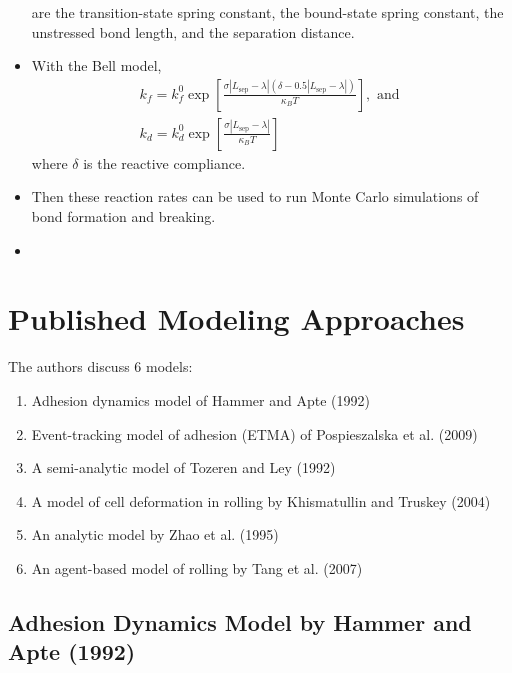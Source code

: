 \documentclass[
10pt, %
letterpaper, %
twocolumn, %
landscape %
]{article}
\begin{document}
\begin{itemize}
  are the transition-state spring constant, the bound-state spring
  constant, the unstressed bond length, and the separation distance.
\item With the Bell model, 
  \begin{align*}
    k_f = k_f^0 \exp\left[\frac{\sigma \left| L_\text{sep} - \lambda
    \right|(\delta - 0.5\left|L_\text{sep} - \lambda\right|)}{\kappa_B
    T}\right], \text{ and } \\ 
    k_d = k_d^0\exp\left[\frac{\sigma\left|L_\text{sep} -
    \lambda\right|}{\kappa_B T}\right]
  \end{align*}
  where $\delta$ is the reactive compliance.
\item Then these reaction rates can be used to run Monte Carlo
  simulations of bond formation and breaking.
\item 
\end{itemize}


\section{Published Modeling Approaches} 

The authors discuss 6 models:
\begin{enumerate}
\item Adhesion dynamics model of Hammer and Apte (1992)
\item Event-tracking model of adhesion (ETMA) of Pospieszalska et
  al. (2009)
\item A semi-analytic model of Tozeren and Ley (1992)
\item A model of cell deformation in rolling by Khismatullin and
  Truskey (2004)
\item An analytic model by Zhao et al. (1995)
\item An agent-based model of rolling by Tang et al. (2007)
\end{enumerate}

\subsection{Adhesion Dynamics Model by Hammer and Apte (1992)}
\label{sec:adhes-dynam-model}
\end{document}

